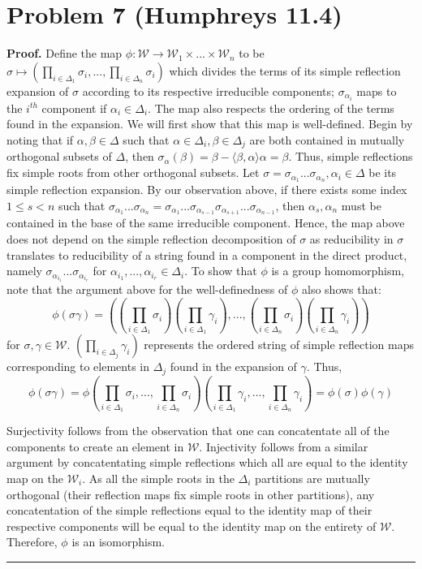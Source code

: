 \documentclass[12pt]{article}%
\newenvironment{proof}[1][Proof]{\textbf{#1.} }{\ \rule{0.5em}{0.5em}}
\begin{document}
\section*{Problem 7 (Humphreys 11.4)}
\begin{proof}
  Define the map $\phi: \mathcal{W} \rightarrow \mathcal{W}_1 \times ... \times \mathcal{W}_n$ to be $\sigma \mapsto (\prod_{i \in \Delta_1} \sigma_i,...,\prod_{i \in \Delta_n} \sigma_i)$ which divides the terms of its simple reflection expansion of $\sigma$ according to its respective irreducible components; $\sigma_{\alpha_i}$ maps to the $i^{th}$ component if $\alpha_i \in \Delta_i$. The map also respects the ordering of the terms found in the expansion. We will first show that this map is well-defined. Begin by noting that if $\alpha,\beta \in \Delta$ such that $\alpha \in \Delta_i, \beta \in \Delta_j$ are both contained in mutually orthogonal subsets of $\Delta$, then $\sigma_{\alpha}(\beta) = \beta - \langle \beta,\alpha \rangle \alpha = \beta$. Thus, simple reflections fix simple roots from other orthogonal subsets. Let $\sigma = \sigma_{\alpha_1}...\sigma_{\alpha_n}, \alpha_i \in \Delta$ be its simple reflection expansion. By our observation above, if there exists some index $1 \leq s < n$ such that $\sigma_{\alpha_1}...\sigma_{\alpha_n} = \sigma_{\alpha_1}...\sigma_{\alpha_{s-1}}\sigma_{\alpha_{s+1}}...\sigma_{\alpha_{n-1}}$, then $\alpha_s,\alpha_n$ must be contained in the base of the same irreducible component. Hence, the map above does not depend on the simple reflection decomposition of $\sigma$ as reducibility in $\sigma$ translates to reducibility of a string found in a component in the direct product, namely $\sigma_{\alpha_{i_1}}...\sigma_{\alpha_{i_r}}$ for $\alpha_{i_1},...,\alpha_{i_r} \in \Delta_i$.
  To show that $\phi$ is a group homomorphism, note that the argument above for the well-definedness of $\phi$ also shows that:
  $$ \phi(\sigma\gamma) = ((\prod_{i \in \Delta_1} \sigma_i)(\prod_{i \in \Delta_1} \gamma_i),...,(\prod_{i \in \Delta_n} \sigma_i)(\prod_{i \in \Delta_n} \gamma_i)) $$ for $\sigma,\gamma \in \mathcal{W}$.
  $(\prod_{i \in \Delta_j} \gamma_i)$ represents the ordered string of simple reflection maps corresponding to elements in $\Delta_j$ found in the expansion of $\gamma$.
  Thus,
  $$ \phi(\sigma\gamma) = \phi(\prod_{i \in \Delta_1} \sigma_i,...,\prod_{i \in \Delta_n} \sigma_i)(\prod_{i \in \Delta_1} \gamma_i,...,\prod_{i \in \Delta_n} \gamma_i) = \phi(\sigma)\phi(\gamma)$$

  Surjectivity follows from the observation that one can concatentate all of the components to create an element in $\mathcal{W}$. Injectivity follows from a similar argument by concatentating simple reflections which all are equal to the identity map on the $\mathcal{W}_i$. As all the simple roots in the $\Delta_i$ partitions are mutually orthogonal (their reflection maps fix simple roots in other partitions), any concatentation of the simple reflections equal to the identity map of their respective components will be equal to the identity map on the entirety of $\mathcal{W}$. Therefore, $\phi$ is an isomorphism.
\end{proof}
\end{document}
